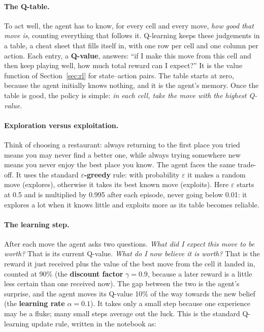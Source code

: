 \documentclass[11pt, a4paper]{article}
\begin{document}
\paragraph{The Q-table.} To act well, the agent has to know, for every cell and every move, \emph{how good that move is}, counting everything that follows it. Q-learning keeps these judgements in a table, a cheat sheet that fills itself in, with one row per cell and one column per action. Each entry, a \textbf{Q-value}, answers: ``if I make this move from this cell and then keep playing well, how much total reward can I expect?'' It is the value function of Section~\ref{sec:rl} for state--action pairs. The table starts at zero, because the agent initially knows nothing, and it is the agent's memory. Once the table is good, the policy is simple: \emph{in each cell, take the move with the highest Q-value.}

\paragraph{Exploration versus exploitation.} Think of choosing a restaurant: always returning to the first place you tried means you may never find a better one, while always trying somewhere new means you never enjoy the best place you know. The agent faces the same trade-off. It uses the standard \textbf{$\varepsilon$-greedy} rule: with probability $\varepsilon$ it makes a random move (explores), otherwise it takes its best known move (exploits). Here $\varepsilon$ starts at 0.5 and is multiplied by 0.995 after each episode, never going below 0.01: it explores a lot when it knows little and exploits more as its table becomes reliable.

\paragraph{The learning step.} After each move the agent asks two questions. \emph{What did I expect this move to be worth?} That is its current Q-value. \emph{What do I now believe it is worth?} That is the reward it just received plus the value of the best move from the cell it landed in, counted at 90\% (the \textbf{discount factor} $\gamma = 0.9$, because a later reward is a little less certain than one received now). The gap between the two is the agent's surprise, and the agent moves its Q-value 10\% of the way towards the new belief (the \textbf{learning rate} $\alpha = 0.1$). It takes only a small step because one experience may be a fluke; many small steps average out the luck. This is the standard Q-learning update rule, written in the notebook as:
\end{document}
